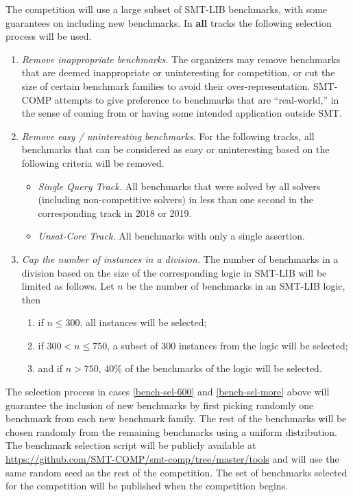 \documentclass[12pt]{article}
\newcommand{\maintrack}{Single Query Track\xspace}
\newcommand{\ucoretrack}{Unsat-Core Track\xspace}
\newcommand{\challtrack}{Industry-Challenge Track\xspace}
\begin{document}
 \label{benchmark-selection}
The competition will use a large subset of SMT-LIB benchmarks, with some
guarantees on including new benchmarks.  In \textbf{all} tracks
the following selection process will be used.
\begin{enumerate}
\item \emph{Remove inappropriate benchmarks.} The
  organizers may remove benchmarks that are deemed inappropriate or
  uninteresting for competition, or cut the size of certain benchmark
  families to avoid their over-representation.  SMT-COMP attempts to
  give preference to benchmarks that are ``real-world,'' in the sense
  of coming from or having some intended application outside SMT.
\item \emph{Remove easy / uninteresting benchmarks.}
  For the following tracks, all benchmarks that can be
  considered as easy or uninteresting based on the following criteria
  will be removed.
  \begin{itemize}
    \item \emph{\maintrack.} All benchmarks that were solved by all
      solvers (including non-competitive solvers) in less than one second in
          the corresponding track in 2018 or 2019.
    \item \emph{\ucoretrack.} All benchmarks with only a single assertion.
  \end{itemize}
\item \emph{Cap the number of instances in a division.}
  The number of benchmarks in a division based on the size of the
  corresponding logic in SMT-LIB will be limited as follows.
  Let $n$ be the number of benchmarks in an SMT-LIB logic, then
  \begin{enumerate}
  \vspace{-1ex}
    \item \label{bench-sel-300} if $n \le 300$, all instances will be selected;
  \item \label{bench-sel-600} if $300 < n \leq 750$, a subset of 300 instances
    from the logic will be selected;
  \item \label{bench-sel-more} and if $n > 750$,
      40\% of the benchmarks of the logic will be selected.
  \end{enumerate}
\end{enumerate}
%
The selection process in cases \ref{bench-sel-600} and \ref{bench-sel-more}
above will guarantee the inclusion of new benchmarks by first picking randomly
one benchmark from each new benchmark family.  The rest of the benchmarks will
be chosen randomly from the remaining benchmarks using a uniform distribution.
%
The benchmark selection script will be publicly available at
\url{https://github.com/SMT-COMP/smt-comp/tree/master/tools} and
will use the same random seed as the rest of the competition.  The set of
benchmarks selected for the competition will be published when the competition
begins.
\end{document}
